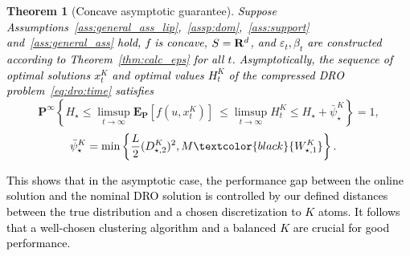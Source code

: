 \documentclass[12pt]{article}
\newcommand{\reals}{{\bf R}}
\newcommand{\unc}{u}
\newcommand{\epsnom}{\varepsilon}
\newcommand{\ld}{W}
\newtheorem{theorem}{Theorem}[section]  %
\newcommand{\RC}[1]{\textcolor{black}{#1}}
\newcommand{\RC}[1]{\textcolor{blue}{#1}}
\begin{document}
\begin{theorem}[\RC{Concave} asymptotic guarantee]
\label{thm:asym_concave}
\RC{Suppose Assumptions~\ref{ass:general_ass_lip},~\ref{assp:dom},~\ref{ass:support} and~\ref{ass:general_ass} hold,  $f$ is concave, $S = \reals^d$, and $\epsnom_t,\beta_t$ are constructed according to Theorem~\ref{thm:calc_eps} for all $t$. 
Asymptotically, 
\ifpreprint the sequence of optimal solutions $x^K_t$ and optimal values $H^K_t$ of the compressed \gls{DRO} problem~\eqref{eq:dro:time} satisfies\fi}
\vspace{-0.6em}
\begin{equation*} 
\mathbf{P}^\infty\left\{ H_\star \leq  \limsup_{t \rightarrow \infty }\mathbf{E}_{\mathbf{P}}[f(\unc, x^K_{t})]\ \leq \limsup_{t \rightarrow \infty } H^K_t \leq H_\star + \bar{\psi}_\star^K \right\} = 1,
\end{equation*}
\vspace{-2em}
\begin{equation*}
    \begin{aligned}
        \bar{\psi}_\star^K &=
\min \left\{ {\frac{L}{2}}(D^K_{\star,2})^2, M\RC{\ld^K_{\star,1}}\right\}.
    \end{aligned}
\end{equation*}
\end{theorem}
\RC{This shows that in the asymptotic case, the performance gap between the online solution and the nominal \gls{DRO} solution is controlled by our defined distances between the true distribution and a chosen discretization to $K$ atoms. It follows that a well-chosen clustering algorithm and a balanced $K$ are crucial for good performance.}
\end{document}

